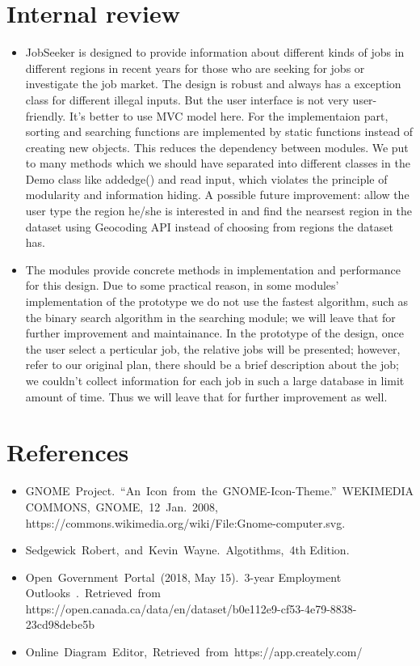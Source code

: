 \documentclass[12pt]{article}
\begin{document}
\section{Internal review}
\begin{itemize}
\item JobSeeker is designed to provide information about different kinds of jobs in different regions in recent years for those who are seeking for jobs or investigate the job market. The design is robust and always has a exception class for different illegal inputs. But the user interface is not very user-friendly. It's better to use MVC model here. For the implementaion part, sorting and searching functions are implemented by static functions instead of creating new objects. This reduces the dependency between modules. We put to many methods which we should have separated into different classes in the Demo class like addedge() and read input, which violates the principle of modularity and information hiding. A possible future improvement: allow the user type the region he/she is interested in and find the nearsest region in the dataset using Geocoding API instead of choosing from regions the dataset has.
\item The modules provide concrete methods in implementation and performance for this design. Due to some practical reason, in some modules' implementation of the prototype we do not use the fastest algorithm, such as the binary search algorithm in the searching module; we will leave that for further improvement and maintainance. In the prototype of the design, once the user select a perticular job, the relative jobs will be presented; however, refer to our original plan, there should be a brief description about the job; we couldn't collect information for each job in such a large database in limit amount of time. Thus we will leave that for further improvement as well.
\end{itemize}
\newpage
\section{References}
\begin{itemize}
\item GNOME\ Project.\ “An\ Icon\ from\ the\ GNOME-Icon-Theme.”\ WEKIMEDIA\\ COMMONS,\ GNOME,\ 12\ Jan.\ 2008, https://commons.wikimedia.org/wiki/File:Gnome-computer.svg.
\item Sedgewick\ Robert,\ and\ Kevin\ Wayne.\ Algotithms,\ 4th Edition.
\item Open\ Government\ Portal\ (2018, May 15).\ 3-year Employment Outlooks\ .\ Retrieved\ from
https://open.canada.ca/data/en/dataset/b0e112e9-cf53-4e79-8838-23cd98debe5b
\item Online\ Diagram\ Editor,\ Retrieved\ from\ https://app.creately.com/
\end{itemize}
\end{document}
